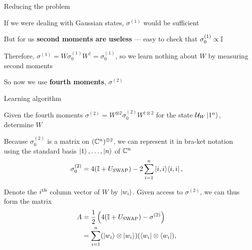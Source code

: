 \begin{frame}{Reducing the problem}
    \begin{spaceditemize}
        \item If we were dealing with Gaussian states, \(\sigma^{(1)}\) would be sufficient
        \item But for us \textbf{second moments are useless} --- easy to check that \(\sigma^{(1)}_0 \propto \mathbb{I}\)
        \item Therefore, \(\sigma^{(1)} = W \sigma^{(1)}_0 W^\dag = \sigma^{(1)}_0\), so we learn nothing about \(W\) by measuring second moments
        \item So now we use \textbf{fourth moments}, \(\sigma^{(2)}\)
    \end{spaceditemize}
\end{frame}


\begin{frame}{Learning algorithm}
    \begin{block}{}
        Given the fourth moments \(\sigma^{(2)} = W^{\otimes 2} \sigma^{(2)}_0 W^{\dag \otimes 2}\) for the state \(\calU_W \ket{1^n}\), determine \(W\)
    \end{block}
    \vfill
    \begin{spaceditemize}[0em]
        \item Because \( \sigma^{(2)}_0 \) is a matrix on \( (\mathbb{C}^{n})^{\otimes 2} \), we can represent it in bra-ket notation using the standard basis \( \ket{1},\dots,\ket{n} \) of \( \mathbb{C}^n \)
        \begin{equation*}
            \sigma^{(2)}_0 = 4 (\bbI + U_{\rm SWAP})
            - 2\sum_{i=1}^{n}\ket{i,i}\bra{i,i},
        \end{equation*}
        \item Denote the \( i^{\rm th} \) column vector of \( W \) by \( \ket{w_i} \).
        Given access to \(\sigma^{(2)}\), we can thus form the matrix
        \begin{align*}
            A & = \frac{1}{2}\parentheses{4(\mathbb I + U_{\rm SWAP}) - \sigma^{(2)}}     \\
              & =  \sum_{i=1}^n (\ket{w_i}\otimes \ket{w_i})(\bra{w_i}\otimes \bra{w_i}),
        \end{align*}
    \end{spaceditemize}
\end{frame}

